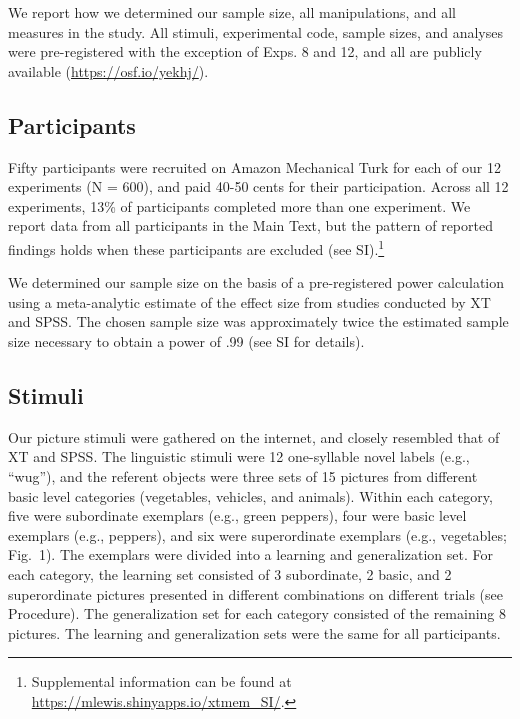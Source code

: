 \documentclass[english,floatsintext,man]{apa6}
\theoremstyle{definition}
\theoremstyle{definition}
\theoremstyle{definition}
\theoremstyle{remark}
\begin{document}
We report how we determined our sample size, all manipulations, and all
measures in the study. All stimuli, experimental code, sample sizes, and
analyses were pre-registered with the exception of Exps. 8 and 12, and
all are publicly available (\url{https://osf.io/yekhj/}).

\subsection{Participants}\label{participants}

Fifty participants were recruited on Amazon Mechanical Turk for each of
our 12 experiments (N = 600), and paid 40-50 cents for their
participation. Across all 12 experiments, 13\% of participants completed
more than one experiment. We report data from all participants in the
Main Text, but the pattern of reported findings holds when these
participants are excluded (see
SI).\footnote{Supplemental information can be found at \url{https://mlewis.shinyapps.io/xtmem_SI/}.}

We determined our sample size on the basis of a pre-registered power
calculation using a meta-analytic estimate of the effect size from
studies conducted by XT and SPSS. The chosen sample size was
approximately twice the estimated sample size necessary to obtain a
power of .99 (see SI for details).

\subsection{Stimuli}\label{stimuli}

Our picture stimuli were gathered on the internet, and closely resembled
that of XT and SPSS. The linguistic stimuli were 12 one-syllable novel
labels (e.g., \enquote{wug}), and the referent objects were three sets
of 15 pictures from different basic level categories (vegetables,
vehicles, and animals). Within each category, five were subordinate
exemplars (e.g., green peppers), four were basic level exemplars (e.g.,
peppers), and six were superordinate exemplars (e.g., vegetables;
Fig.~1). The exemplars were divided into a learning and generalization
set. For each category, the learning set consisted of 3 subordinate, 2
basic, and 2 superordinate pictures presented in different combinations
on different trials (see Procedure). The generalization set for each
category consisted of the remaining 8 pictures. The learning and
generalization sets were the same for all participants.
\end{document}
